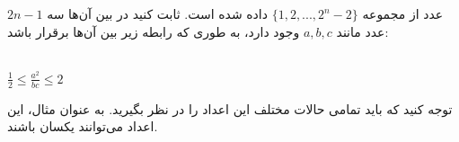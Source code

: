 \p
$2n-1$
     عدد از مجموعه 
$\{1, 2, ..., 2^n-2\}$
 داده شده است. ثابت کنید در بین آن‌ها سه عدد مانند
$a, b, c $
 وجود دارد، به طوری که رابطه زیر بین آن‌ها برقرار باشد:\\ \\
    \centerline{$\frac{1}{2} \leq \frac{a^2}{bc} \leq 2$}
    توجه کنید که باید تمامی حالات مختلف این اعداد را در نظر بگیرید. به عنوان مثال، این اعداد می‌توانند یکسان باشند.